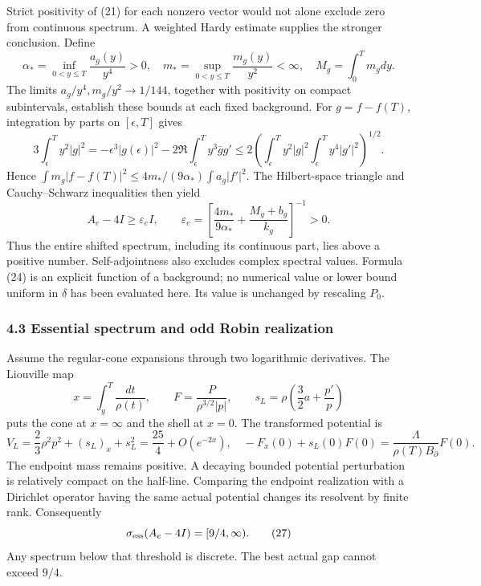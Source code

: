 \documentclass[
  11pt,
]{article}
\begin{document}
Strict positivity of (21) for each nonzero vector would not alone
exclude zero from continuous spectrum. A weighted Hardy estimate
supplies the stronger conclusion. Define \[
 \alpha_*=\inf_{0<y\le T}\frac{a_g(y)}{y^4}>0,\quad
 m_*=\sup_{0<y\le T}\frac{m_g(y)}{y^2}<\infty,\quad
 M_g=\int_0^T m_gdy.
 \tag{22}
\] The limits \(a_g/y^4,m_g/y^2\to1/144\), together with positivity on
compact subintervals, establish these bounds at each fixed background.
For \(g=f-f(T)\), integration by parts on \([\epsilon,T]\) gives \[
 3\int_\epsilon^T y^2|g|^2
 =-\epsilon^3|g(\epsilon)|^2
 -2\Re\int_\epsilon^T y^3\bar g g'
 \le2\left(\int_\epsilon^T y^2|g|^2
             \int_\epsilon^T y^4|g'|^2\right)^{1/2}.
 \tag{23}
\] Hence \(\int m_g|f-f(T)|^2\le
4m_*/(9\alpha_*)\int a_g|f'|^2\). The Hilbert-space triangle and
Cauchy--Schwarz inequalities then yield \[
 \boxed{\quad A_e-4I\ge\varepsilon_e I,\qquad
 \varepsilon_e=
 \left[\frac{4m_*}{9\alpha_*}+\frac{M_g+b_g}{k_g}\right]^{-1}>0.\quad}
 \tag{24}
\] Thus the entire shifted spectrum, including its continuous part, lies
above a positive number. Self-adjointness also excludes complex spectral
values. Formula (24) is an explicit function of a background; no
numerical value or lower bound uniform in \(\delta\) has been evaluated
here. Its value is unchanged by rescaling \(P_0\).

\subsubsection{4.3 Essential spectrum and odd Robin
realization}\label{essential-spectrum-and-odd-robin-realization}

Assume the regular-cone expansions through two logarithmic derivatives.
The Liouville map \[
 x=\int_y^T\frac{dt}{\rho(t)},\qquad
 F=\frac{P}{\rho^{3/2}|p|},\qquad
 s_L=\rho\left(\frac32a+\frac{p'}p\right)
 \tag{25}
\] puts the cone at \(x=\infty\) and the shell at \(x=0\). The
transformed potential is \[
 V_L=\frac23\rho^2p^2+(s_L)_x+s_L^2
       =\frac{25}{4}+O(e^{-2x}),
 \quad
 -F_x(0)+s_L(0)F(0)=
       \frac{\Lambda}{\rho(T)B_\partial}F(0).
 \tag{26}
\] The endpoint mass remains positive. A decaying bounded potential
perturbation is relatively compact on the half-line. Comparing the
endpoint realization with a Dirichlet operator having the same actual
potential changes its resolvent by finite rank. Consequently \[
 \sigma_{\rm ess}(A_e-4I)=[9/4,\infty).
 \tag{27}
\] Any spectrum below that threshold is discrete. The best actual gap
cannot exceed \(9/4\).
\end{document}
